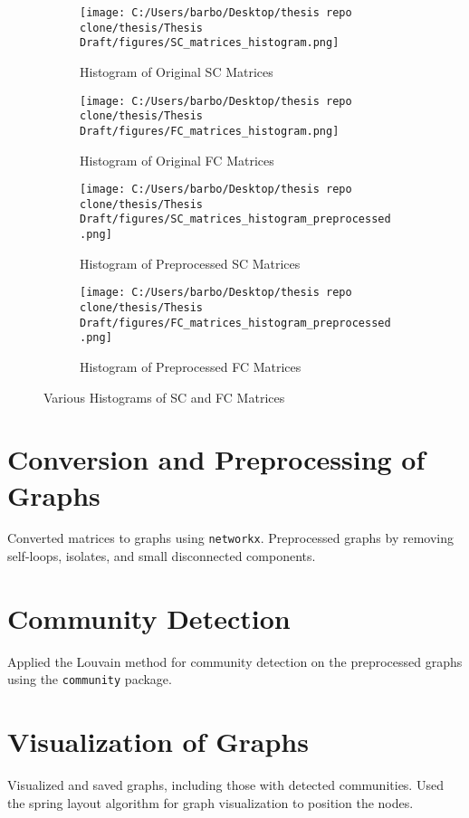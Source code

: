 \begin{figure}[h!]
    \centering
    \begin{subfigure}[b]{0.45\textwidth}
        \texttt{[image: C:/Users/barbo/Desktop/thesis repo clone/thesis/Thesis Draft/figures/SC\_matrices\_histogram.png]}
        \caption{Histogram of Original SC Matrices}
    \end{subfigure}
    \begin{subfigure}[b]{0.45\textwidth}
        \texttt{[image: C:/Users/barbo/Desktop/thesis repo clone/thesis/Thesis Draft/figures/FC\_matrices\_histogram.png]}
        \caption{Histogram of Original FC Matrices}
    \end{subfigure}
    \begin{subfigure}[b]{0.45\textwidth}
        \texttt{[image: C:/Users/barbo/Desktop/thesis repo clone/thesis/Thesis Draft/figures/SC\_matrices\_histogram\_preprocessed.png]}
        \caption{Histogram of Preprocessed SC Matrices}
    \end{subfigure}
    \begin{subfigure}[b]{0.45\textwidth}
        \texttt{[image: C:/Users/barbo/Desktop/thesis repo clone/thesis/Thesis Draft/figures/FC\_matrices\_histogram\_preprocessed.png]}
        \caption{Histogram of Preprocessed FC Matrices}
    \end{subfigure}
    
    \caption{Various Histograms of SC and FC Matrices}
\end{figure}


\section{Conversion and Preprocessing of Graphs}
Converted matrices to graphs using \texttt{networkx}. Preprocessed graphs by removing self-loops, isolates, and small disconnected components.

\section{Community Detection}
Applied the Louvain method for community detection on the preprocessed graphs using the \texttt{community} package.

\section{Visualization of Graphs}
Visualized and saved graphs, including those with detected communities. Used the spring layout algorithm for graph visualization to position the nodes. 

